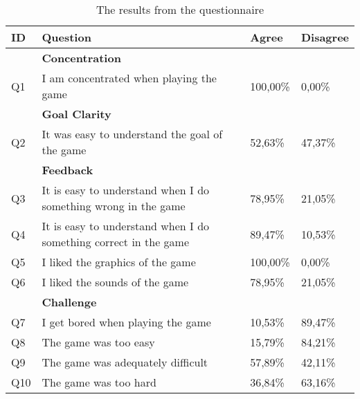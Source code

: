 \begin{table}[]
	\centering
	\caption{The results from the questionnaire}
	\label{tab:simple_results}
	\begin{tabularx}{\textwidth}{|l|X|l|l|}
		\hline
		\textbf{ID} & \textbf{Question}                                              & \textbf{Agree} & \textbf{Disagree} \\ \hline
		\textbf{}   & \textbf{Concentration}                                         & \textbf{}      & \textbf{}         \\ \hline
		Q1          & I am concentrated when playing the game                        & 100,00\%       & 0,00\%            \\ \hline
		\textbf{}   & \textbf{Goal Clarity}                                          & \textbf{}      & \textbf{}         \\ \hline
		Q2          & It was easy to understand the goal of the game                 & 52,63\%        & 47,37\%           \\ \hline
		\textbf{}   & \textbf{Feedback}                                              & \textbf{}      & \textbf{}         \\ \hline
		Q3          & It is easy to understand when I do something wrong in the game & 78,95\%        & 21,05\%           \\ \hline
		Q4          & It is easy to understand when I do something correct in the game& 89,47\%        & 10,53\%           \\ \hline
		Q5          & I liked the graphics of the game                               & 100,00\%       & 0,00\%            \\ \hline
		Q6          & I liked the sounds of the game                                 & 78,95\%        & 21,05\%           \\ \hline
		\textbf{}   & \textbf{Challenge}                                             & \textbf{}      & \textbf{}         \\ \hline
		Q7          & I get bored when playing the game                              & 10,53\%        & 89,47\%           \\ \hline
		Q8          & The game was too easy                                          & 15,79\%        & 84,21\%           \\ \hline
		Q9          & The game was adequately difficult                              & 57,89\%        & 42,11\%           \\ \hline
		Q10         & The game was too hard                                          & 36,84\%        & 63,16\%           \\ \hline

\end{tabularx}
\end{table}
